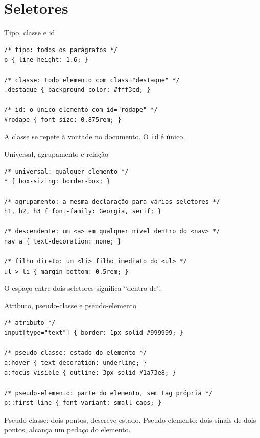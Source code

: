 \documentclass{beamer}
\begin{document}
\section{Seletores}

\begin{frame}[fragile]{Tipo, classe e id}
	\begin{verbatim}
/* tipo: todos os parágrafos */
p { line-height: 1.6; }

/* classe: todo elemento com class="destaque" */
.destaque { background-color: #fff3cd; }

/* id: o único elemento com id="rodape" */
#rodape { font-size: 0.875rem; }
  \end{verbatim}

	\vspace{0.2cm}
	A classe se repete à vontade no documento. O \texttt{id} é único.
\end{frame}

\begin{frame}[fragile]{Universal, agrupamento e relação}
	\begin{verbatim}
/* universal: qualquer elemento */
* { box-sizing: border-box; }

/* agrupamento: a mesma declaração para vários seletores */
h1, h2, h3 { font-family: Georgia, serif; }

/* descendente: um <a> em qualquer nível dentro do <nav> */
nav a { text-decoration: none; }

/* filho direto: um <li> filho imediato do <ul> */
ul > li { margin-bottom: 0.5rem; }
  \end{verbatim}

	\vspace{0.2cm}
	O espaço entre dois seletores significa ``dentro de''.
\end{frame}

\begin{frame}[fragile]{Atributo, pseudo-classe e pseudo-elemento}
	\begin{verbatim}
/* atributo */
input[type="text"] { border: 1px solid #999999; }

/* pseudo-classe: estado do elemento */
a:hover { text-decoration: underline; }
a:focus-visible { outline: 3px solid #1a73e8; }

/* pseudo-elemento: parte do elemento, sem tag própria */
p::first-line { font-variant: small-caps; }
  \end{verbatim}

	\vspace{0.2cm}
	Pseudo-classe: dois pontos, descreve estado. Pseudo-elemento: dois sinais de
	dois pontos, alcança um pedaço do elemento.
\end{frame}
\end{document}
